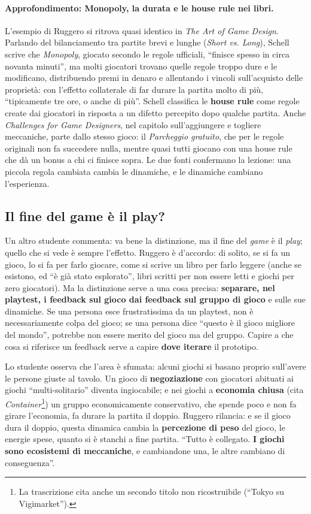 \paragraph{Approfondimento: Monopoly, la durata e le house rule nei libri.}
L'esempio di Ruggero si ritrova quasi identico in \emph{The Art of Game Design}.
Parlando del bilanciamento tra partite brevi e lunghe (\emph{Short vs. Long}),
Schell scrive che \emph{Monopoly}, giocato secondo le regole ufficiali,
``finisce spesso in circa novanta minuti'', ma molti giocatori trovano quelle
regole troppo dure e le modificano, distribuendo premi in denaro e allentando i
vincoli sull'acquisto delle proprietà: con l'effetto collaterale di far durare la
partita molto di più, ``tipicamente tre ore, o anche di più''. Schell classifica
le \textbf{house rule} come regole create dai giocatori in risposta a un
difetto percepito dopo qualche partita. Anche \emph{Challenges for Game
Designers}, nel capitolo sull'aggiungere e togliere meccaniche, parte dallo
stesso gioco: il \emph{Parcheggio gratuito}, che per le regole originali non fa
succedere nulla, mentre quasi tutti giocano con una house rule che dà un bonus a
chi ci finisce sopra. Le due fonti confermano la lezione: una piccola regola
cambiata cambia le dinamiche, e le dinamiche cambiano l'esperienza.

\subsection{Il fine del game è il play?}

Un altro studente commenta: va bene la distinzione, ma il fine del \emph{game} è
il \emph{play}; quello che si vede è sempre l'effetto. Ruggero è d'accordo: di
solito, se si fa un gioco, lo si fa per farlo giocare, come si scrive un libro
per farlo leggere (anche se esistono, ed ``è già stato esplorato'', libri scritti
per non essere letti e giochi per zero giocatori). Ma la distinzione serve a una
cosa precisa: \textbf{separare, nel playtest, i feedback sul gioco dai feedback
sul gruppo di gioco} e sulle sue dinamiche. Se una persona esce frustratissima da
un playtest, non è necessariamente colpa del gioco; se una persona dice ``questo
è il gioco migliore del mondo'', potrebbe non essere merito del gioco ma del
gruppo. Capire a che cosa si riferisce un feedback serve a capire \textbf{dove
iterare} il prototipo.

Lo studente osserva che l'area è sfumata: alcuni giochi si basano proprio
sull'avere le persone giuste al tavolo. Un gioco di \textbf{negoziazione} con
giocatori abituati ai giochi ``multi-solitario'' diventa ingiocabile; e nei giochi
a \textbf{economia chiusa} (cita \emph{Container}\footnote{La trascrizione cita
anche un secondo titolo non ricostruibile (``Tokyo su Vigimarket'').}) un gruppo
economicamente conservativo, che spende poco e non fa girare l'economia, fa
durare la partita il doppio. Ruggero rilancia: e se il gioco dura il doppio,
questa dinamica cambia la \textbf{percezione di peso} del gioco, le energie spese,
quanto si è stanchi a fine partita. ``Tutto è collegato. \textbf{I giochi sono
ecosistemi di meccaniche}, e cambiandone una, le altre cambiano di
conseguenza''.

